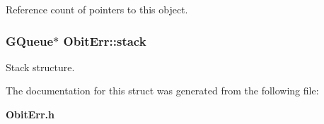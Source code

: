 Reference count of pointers to this object. 

\subsubsection{\setlength{\rightskip}{0pt plus 5cm}GQueue$\ast$ {\bf Obit\-Err::stack}}\label{structObitErr_o3}


Stack structure. 



The documentation for this struct was generated from the following file:\begin{CompactItemize}
\item 
{\bf Obit\-Err.h}\end{CompactItemize}
